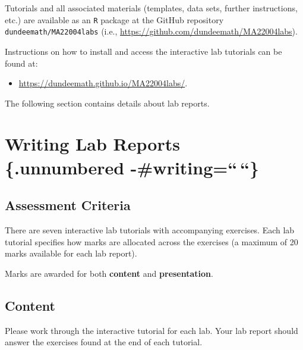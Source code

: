 \documentclass[
  a4paper,
  oneside]{book}
\providecommand{\tightlist}{%
  \setlength{\itemsep}{0pt}\setlength{\parskip}{0pt}}\usepackage{longtable,booktabs,array}
\theoremstyle{definition}
\theoremstyle{definition}
\theoremstyle{definition}
\theoremstyle{plain}
\theoremstyle{remark}
\begin{document}
Tutorials and all associated materials (templates, data sets, further
instructions, etc.) are available as an \texttt{R} package at the GitHub
repository \texttt{dundeemath/MA22004labs} (i.e.,
\url{https://github.com/dundeemath/MA22004labs}).

Instructions on how to install and access the interactive lab tutorials
can be found at:

\begin{itemize}
\tightlist
\item
  \url{https://dundeemath.github.io/MA22004labs/}.
\end{itemize}

The following section contains details about lab reports.

\chapter*{Writing Lab Reports \{.unnumbered
-\#writing=``\,``\}}\label{writing-lab-reports-.unnumbered--writing}


\section*{Assessment Criteria}\label{w-assess}


There are seven interactive lab tutorials with accompanying exercises.
Each lab tutorial specifies how marks are allocated across the exercises
(a maximum of 20 marks available for each lab report).

\begin{importantblock}
Marks are awarded for both \textbf{content} and \textbf{presentation}.

\end{importantblock}

\section*{Content}\label{w-content}


Please work through the interactive tutorial for each lab. Your lab
report should answer the exercises found at the end of each tutorial.
\end{document}
